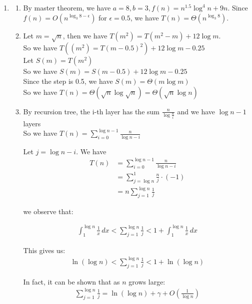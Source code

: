 \documentclass[letterpaper, 11pt]{article}
\newcommand{\1}{\mathds{1}}	%
\theoremstyle{definition}
\newenvironment{solution}{{\par\noindent\it Solution.}}{}
\begin{document}
\begin{solution}
    \begin{enumerate}
        \item
       \begin{enumerate}
            \item  By master theorem, we have $a=8, b=3, f(n)=n^{1.5} \log^4 n + 9n$. Since $f(n)=O(n^{\log_3 8-\epsilon})$ for $\epsilon=0.5$, we have $T(n)=\Theta(n^{\log_3 8})$.
            \item Let $m=\sqrt{n}$, then we have $T(m^2)=T(m^2-m)+12\log m$. \\
            So we have $ T((m^2)=T(m-0.5)^2)+12\log m -0.25 $ \\
            Let $S(m)=T(m^2)$\\
            So we have $S(m)=S(m-0.5)+12\log m -0.25$\\
            Since the step is 0.5, we have $S(m)=\Theta(m\log m)$\\
            So we have $T(n)=\Theta(\sqrt{n}\log \sqrt{n})=\Theta(\sqrt{n}\log n)$
            \item By recursion tree, the i-th layer has the sum $ \frac{n}{\log \frac{n}{i}} $ and we have $\log n -1 $ layers 
            \\So we have $T(n) = \sum_{i=0}^{\log n-1} \frac{n}{\log n - i}$

            Let $j = \log n - i$. We have
            \begin{align*}
            T(n) &= \sum_{i=0}^{\log n-1} \frac{n}{\log n - i} \\
            &= \sum_{j=\log n}^{1} \frac{n}{j} \cdot (-1)  \\
            &= n \sum_{j=1}^{\log n} \frac{1}{j} 
            \end{align*}
            
  we observe that:
            
            \begin{align*}
            \int_{1}^{\log n} \frac{1}{x}\,dx < \sum_{j=1}^{\log n} \frac{1}{j} < 1 + \int_{1}^{\log n} \frac{1}{x}\,dx
            \end{align*}
            
            This gives us:
            \begin{align*}
            \ln(\log n) < \sum_{j=1}^{\log n} \frac{1}{j} < 1 + \ln(\log n)
            \end{align*}
            
            In fact, it can be shown that as $n$ grows large:
            \begin{align*}
            \sum_{j=1}^{\log n} \frac{1}{j} = \ln(\log n) + \gamma + O\left(\frac{1}{\log n}\right)
            \end{align*}
            

\end{enumerate}
\end{enumerate}
\end{solution}
\end{document}
